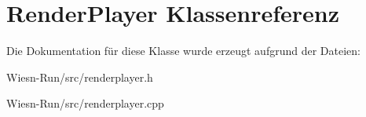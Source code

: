 \hypertarget{classRenderPlayer}{\section{Render\-Player Klassenreferenz}
\label{classRenderPlayer}
}


Die Dokumentation für diese Klasse wurde erzeugt aufgrund der Dateien\-:\begin{DoxyCompactItemize}
\item 
Wiesn-\/\-Run/src/renderplayer.\-h\item 
Wiesn-\/\-Run/src/renderplayer.\-cpp\end{DoxyCompactItemize}
